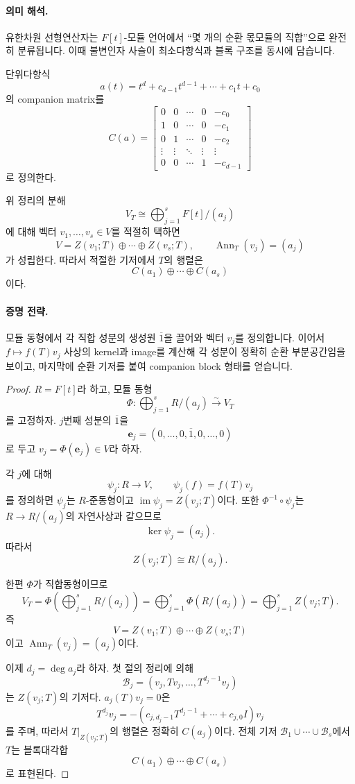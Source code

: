 \paragraph{의미 해석.}
유한차원 선형연산자는 $F[t]$-모듈 언어에서 ``몇 개의 순환 몫모듈의 직합''으로 완전히 분류됩니다. 이때 불변인자 사슬이 최소다항식과 블록 구조를 동시에 담습니다.

\begin{definition}
단위다항식
\[
a(t)=t^d+c_{d-1}t^{d-1}+\cdots+c_1t+c_0
\]
의 companion matrix를
\[
C(a)=
\begin{bmatrix}
0&0&\cdots&0&-c_0\\
1&0&\cdots&0&-c_1\\
0&1&\cdots&0&-c_2\\
\vdots&\vdots&\ddots&\vdots&\vdots\\
0&0&\cdots&1&-c_{d-1}
\end{bmatrix}
\]
로 정의한다.
\end{definition}

\begin{theorem}[순환 분해 정리]
위 정리의 분해
\[
V_T\cong \bigoplus_{j=1}^s F[t]/(a_j)
\]
에 대해 벡터 $v_1,\dots,v_s\in V$를 적절히 택하면
\[
V=Z(v_1;T)\oplus\cdots\oplus Z(v_s;T),\qquad
\operatorname{Ann}_T(v_j)=(a_j)
\]
가 성립한다. 따라서 적절한 기저에서 $T$의 행렬은
\[
C(a_1)\oplus\cdots\oplus C(a_s)
\]
이다.
\end{theorem}

\paragraph{증명 전략.}
모듈 동형에서 각 직합 성분의 생성원 $\overline{1}$을 끌어와 벡터 $v_j$를 정의합니다. 이어서 $f\mapsto f(T)v_j$ 사상의 kernel과 image를 계산해 각 성분이 정확히 순환 부분공간임을 보이고, 마지막에 순환 기저를 붙여 companion block 형태를 얻습니다.

\begin{proof}
$R=F[t]$라 하고, 모듈 동형
\[
\Phi:\bigoplus_{j=1}^s R/(a_j)\xrightarrow{\sim} V_T
\]
를 고정하자. $j$번째 성분의 $\overline{1}$을
\[
\mathbf{e}_j=(0,\dots,0,\overline{1},0,\dots,0)
\]
로 두고 $v_j=\Phi(\mathbf{e}_j)\in V$라 하자.

각 $j$에 대해
\[
\psi_j:R\to V,\qquad \psi_j(f)=f(T)v_j
\]
를 정의하면 $\psi_j$는 $R$-준동형이고 $\operatorname{im}\psi_j=Z(v_j;T)$이다. 또한 $\Phi^{-1}\circ\psi_j$는 $R\to R/(a_j)$의 자연사상과 같으므로
\[
\ker\psi_j=(a_j).
\]
따라서
\[
Z(v_j;T)\cong R/(a_j).
\]

한편 $\Phi$가 직합동형이므로
\[
V_T=\Phi\!\left(\bigoplus_{j=1}^s R/(a_j)\right)
=\bigoplus_{j=1}^s \Phi(R/(a_j))
=\bigoplus_{j=1}^s Z(v_j;T).
\]
즉
\[
V=Z(v_1;T)\oplus\cdots\oplus Z(v_s;T)
\]
이고 $\operatorname{Ann}_T(v_j)=(a_j)$이다.

이제 $d_j=\deg a_j$라 하자. 첫 절의 정리에 의해
\[
\mathcal{B}_j=(v_j,Tv_j,\dots,T^{d_j-1}v_j)
\]
는 $Z(v_j;T)$의 기저다. $a_j(T)v_j=0$은
\[
T^{d_j}v_j=-(c_{j,d_j-1}T^{d_j-1}+\cdots+c_{j,0}I)v_j
\]
를 주며, 따라서 $T|_{Z(v_j;T)}$의 행렬은 정확히 $C(a_j)$이다. 전체 기저 $\mathcal{B}_1\cup\cdots\cup\mathcal{B}_s$에서 $T$는 블록대각합
\[
C(a_1)\oplus\cdots\oplus C(a_s)
\]
로 표현된다.
\end{proof}

